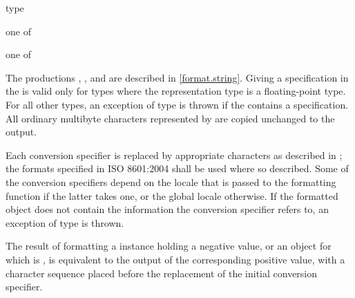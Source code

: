 \begin{ncbnf}
\br
    \noncxxterminal{\%}  type
\end{ncbnf}

\begin{ncbnf}
 \textnormal{one of}\br
\end{ncbnf}

\begin{ncbnf}
 \textnormal{one of}\br
    \br
\end{ncbnf}

The productions
,
, and
are described in \ref{format.string}.
Giving a  specification
in the 
is valid only for  types
where the representation type 
is a floating-point type.
For all other  types,
an exception of type  is thrown
if the 
contains a  specification.
All ordinary multibyte characters
represented by 
are copied unchanged to the output.

\pnum
Each conversion specifier 
is replaced by appropriate characters
as described in ;
the formats specified in ISO 8601:2004 shall be used where so described.
Some of the conversion specifiers
depend on the locale that is passed to the formatting function
if the latter takes one,
or the global locale otherwise.
If the formatted object does not contain the information
the conversion specifier refers to,
an exception of type  is thrown.

\pnum
The result of formatting
a  instance holding a negative value, or
an  object  for which  is ,
is equivalent to the output of the corresponding positive value,
with a  character sequence
placed before the replacement of the initial conversion specifier.
\begin{example}
\end{example}

